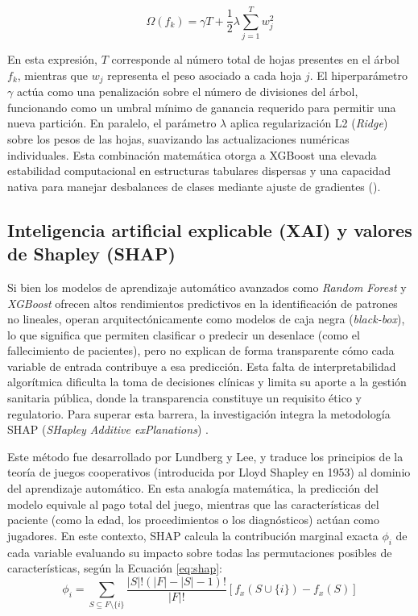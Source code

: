 \begin{equation}
    \Omega(f_k) = \gamma T + \frac{1}{2}\lambda \sum_{j=1}^{T} w_j^2
    \label{eq:xgboost_reg}
\end{equation}

En esta expresión, $T$ corresponde al número total de hojas presentes en el árbol $f_k$, mientras que $w_j$ representa el peso asociado a cada hoja $j$. El hiperparámetro $\gamma$ actúa como una penalización sobre el número de divisiones del árbol, funcionando como un umbral mínimo de ganancia requerido para permitir una nueva partición. En paralelo, el parámetro $\lambda$ aplica regularización L2 (\textit{Ridge}) sobre los pesos de las hojas, suavizando las actualizaciones numéricas individuales. Esta combinación matemática otorga a XGBoost una elevada estabilidad computacional en estructuras tabulares dispersas y una capacidad nativa para manejar desbalances de clases mediante ajuste de gradientes (\cite{chen2016xgboost}).

\subsection{Inteligencia artificial explicable (XAI) y valores de Shapley (SHAP)}

Si bien los modelos de aprendizaje automático avanzados como \textit{Random Forest} y \textit{XGBoost} ofrecen altos rendimientos predictivos en la identificación de patrones no lineales, operan arquitectónicamente como modelos de caja negra (\textit{black-box}), lo que significa que permiten clasificar o predecir un desenlace (como el fallecimiento de pacientes), pero no explican de forma transparente cómo cada variable de entrada contribuye a esa predicción. Esta falta de interpretabilidad algorítmica dificulta la toma de decisiones clínicas y limita su aporte a la gestión sanitaria pública, donde la transparencia constituye un requisito ético y regulatorio. Para superar esta barrera, la investigación integra la metodología SHAP (\textit{SHapley Additive exPlanations}) \cite{lundberg2017shap}.

Este método fue desarrollado por Lundberg y Lee, y traduce los principios de la teoría de juegos cooperativos (introducida por Lloyd Shapley en 1953) al dominio del aprendizaje automático. En esta analogía matemática, la predicción del modelo equivale al pago total del juego, mientras que las características del paciente (como la edad, los procedimientos o los diagnósticos) actúan como jugadores. En este contexto, SHAP calcula la contribución marginal exacta $\phi_i$ de cada variable evaluando su impacto sobre todas las permutaciones posibles de características, según la Ecuación \ref{eq:shap}:
\begin{equation}
    \phi_i = \sum_{S \subseteq F \setminus \{i\}} \frac{|S|! (|F| - |S| - 1)!}{|F|!} [f_x(S \cup \{i\}) - f_x(S)]
    \label{eq:shap}
\end{equation}

